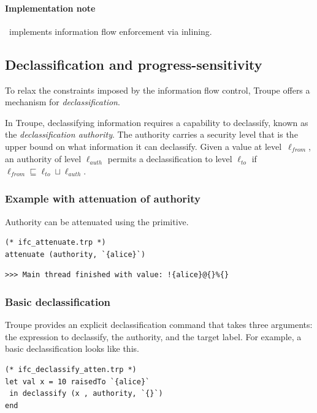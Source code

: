 \paragraph{Implementation note}
\troupelang\ implements information flow enforcement via inlining.

\subsection{Declassification and progress-sensitivity}
\label{sec:declassification}
To relax the constraints imposed by the information flow control, Troupe offers
a mechanism for \emph{declassification}.

In Troupe, declassifying information requires a capability to declassify,
known as the \emph{declassification authority}.
The authority carries a security level that is the upper bound
on what information it can declassify.
%
Given  a value at
level~$\ell_{\mathit{from}}$, an authority of
level $\ell_{\mathit{auth}}$ permits a declassification to level
$\ell_{\mathit{to}}$ if
${\ell_{\mathit{from}}} \sqsubseteq {  \ell_{\mathit{to}} \sqcup \ell_{\mathit{auth}}}.$



\subsubsection{Example with attenuation of authority}
Authority can be attenuated using the  primitive.

\begin{lstlisting}
(* ifc_attenuate.trp *)
attenuate (authority, `{alice}`)
\end{lstlisting}
\begin{verbatim}
>>> Main thread finished with value: !{alice}@{}%{}
\end{verbatim}


\subsubsection{Basic declassification}
Troupe provides an explicit declassification command  that takes three arguments:
the expression to declassify, the authority, and the target label. For example, a basic declassification
looks like this.
\begin{lstlisting}
(* ifc_declassify_atten.trp *)
let val x = 10 raisedTo `{alice}`
 in declassify (x , authority, `{}`)
end
\end{lstlisting}

